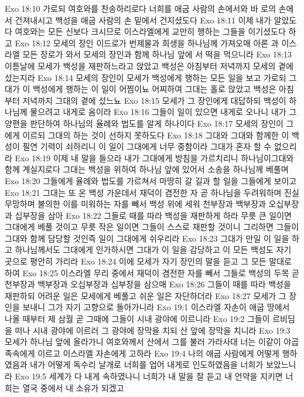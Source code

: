 Exo 18:10  가로되 여호와를 찬송하리로다 너희를 애굽 사람의 손에서와 바 로의 손에서 건져내시고 백성을 애굽 사람의 손 밑에서 건지셨도다
Exo 18:11  이제 내가 알았도다 여호와는 모든 신보다 크시므로 이스라엘에게 교만히 행하는 그들을 이기셨도다 하고
Exo 18:12  모세의 장인 이드로가 번제물과 희생을 하나님께 가져오매 아론 과 이스라엘 모든 장로가 와서 모세의 장인과 함께 하나님 앞에 서 떡을 먹으니라
Exo 18:13  이튿날에 모세가 백성을 재판하느라고 앉았고 백성은 아침부터 저녁까지 모세의 곁에 섰는지라
Exo 18:14  모세의 장인이 모세가 백성에게 행하는 모든 일을 보고 가로되 그대가 이 백성에게 행하는 이 일이 어찜이뇨 어찌하여 그대는 홀로 앉았고 백성은 아침부터 저녁까지 그대의 곁에 섰느뇨
Exo 18:15  모세가 그 장인에게 대답하되 백성이 하나님께 물으려고 내게로 옴이라
Exo 18:16  그들이 일이 있으면 내게로 오나니 내가 그 양편을 판단하여 하나님의 율례와 법도를 알게 하나이다
Exo 18:17  모세의 장인이 그에게 이르되 그대의 하는 것이 선하지 못하도다
Exo 18:18  그대와 그대와 함께한 이 백성이 필연 기력이 쇠하리니 이 일이 그대에게 너무 중함이라 그대가 혼자 할 수 없으리라
Exo 18:19  이제 내 말을 들으라 내가 그대에게 방침을 가르치리니 하나님이그대와 함께 계실지로다 그대는 백성을 위하여 하나님 앞에 있어서 소송을 하나님께 베풀며
Exo 18:20  그들에게 율례와 법도를 가르쳐서 마땅히 갈 길과 할 일을 그들에게 보이고
Exo 18:21  그대는 또 온 백성 가운데서 재덕이 겸전한 자 곧 하나님을 두려워하며 진실무망하며 불의한 이를 미워하는 자를 빼서 백성 위에 세워 천부장과 백부장과 오십부장과 십부장을 삼아
Exo 18:22  그들로 때를 따라 백성을 재판하게 하라 무릇 큰 일이면 그대에게 베풀 것이고 무릇 작은 일이면 그들이 스스로 재판할 것이니 그리하면 그들이 그대와 함께 담당할 것인즉 일이 그대에게 쉬우리라
Exo 18:23  그대가 만일 이 일을 하고 하나님께서도 그대에게 인가하시면 그대가 이 일을 감당하고 이 모든 백성도 자기 곳으로 평안히 가리라
Exo 18:24  이에 모세가 자기 장인의 말을 듣고 그 모든 말대로 하여
Exo 18:25  이스라엘 무리 중에서 재덕이 겸전한 자를 빼서 그들로 백성의 두목 곧 천부장과 백부장과 오십부장과 십부장을 삼으매
Exo 18:26  그들이 때를 따라 백성을 재판하되 어려운 일은 모세에게 베풀고 쉬운 일은 자단하더라
Exo 18:27  모세가 그 장인을 보내니 그가 자기 고향으로 돌아가니라
Exo 19:1  이스라엘 자손이 애굽 땅에서 나올 때부터 제 삼월 곧 그때에 그들이 시내 광야에 이르니라
Exo 19:2  그들이 르비딤을 떠나 시내 광야에 이르러 그 광야에 장막을 치되 산 앞에 장막을 치니라
Exo 19:3  모세가 하나님 앞에 올라가니 여호와께서 산에서 그를 불러 가라사대 너는 이같이 야곱 족속에게 이르고 이스라엘 자손에게 고하라
Exo 19:4  나의 애굽 사람에게 어떻게 행하였음과 내가 어떻게 독수리 날개로 너희를 업어 내게로 인도하였음을 너희가 보았느니라
Exo 19:5  세계가 다 내게 속하였나니 너희가 내 말을 잘 듣고 내 언약을 지키면 너희는 열국 중에서 내 소유가 되겠고
